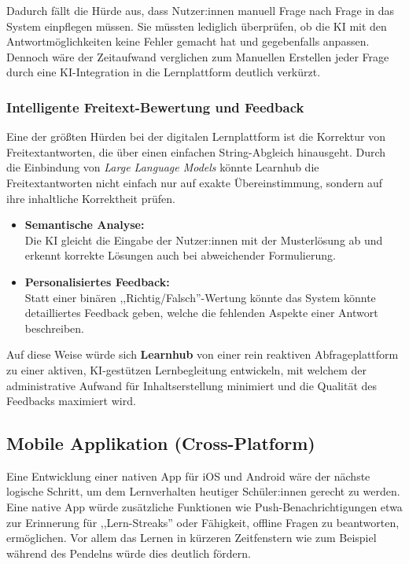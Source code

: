 Dadurch fällt die Hürde aus, dass Nutzer:innen manuell Frage nach Frage in das System einpflegen müssen. Sie müssten lediglich überprüfen, ob die KI mit den Antwortmöglichkeiten keine Fehler gemacht hat und gegebenfalls anpassen. Dennoch wäre der Zeitaufwand verglichen zum Manuellen Erstellen jeder Frage durch eine KI-Integration in die Lernplattform deutlich verkürzt.


\subsubsection{Intelligente Freitext-Bewertung und Feedback}
Eine der größten Hürden bei der digitalen Lernplattform ist die Korrektur von Freitextantworten, die über einen einfachen String-Abgleich hinausgeht. Durch die Einbindung von \textit{Large Language Models} könnte Learnhub die Freitextantworten nicht einfach nur auf exakte Übereinstimmung, sondern auf ihre inhaltliche Korrektheit prüfen. 

\begin{itemize}
	\item \textbf{Semantische Analyse:} \\
	Die KI gleicht die Eingabe der Nutzer:innen mit der Musterlösung ab und erkennt korrekte Lösungen auch bei abweichender Formulierung.
	\item \textbf{Personalisiertes Feedback:} \\
	Statt einer binären ,,Richtig/Falsch''-Wertung könnte das System könnte detailliertes Feedback geben, welche die fehlenden Aspekte einer Antwort  beschreiben.
\end{itemize}

Auf diese Weise würde sich \textbf{Learnhub} von einer rein reaktiven Abfrageplattform zu einer aktiven, KI-gestützen Lernbegleitung entwickeln, mit welchem der administrative Aufwand für Inhaltserstellung minimiert und die Qualität des Feedbacks maximiert wird.


\subsection{Mobile Applikation (Cross-Platform)}

Eine Entwicklung einer nativen App für iOS und Android wäre der nächste logische Schritt, um dem Lernverhalten heutiger Schüler:innen gerecht zu werden. Eine native App würde zusätzliche Funktionen wie Push-Benachrichtigungen etwa zur Erinnerung für ,,Lern-Streaks'' oder Fähigkeit, offline Fragen zu beantworten, ermöglichen. Vor allem das Lernen in kürzeren Zeitfenstern wie zum Beispiel während des Pendelns würde dies deutlich fördern.
